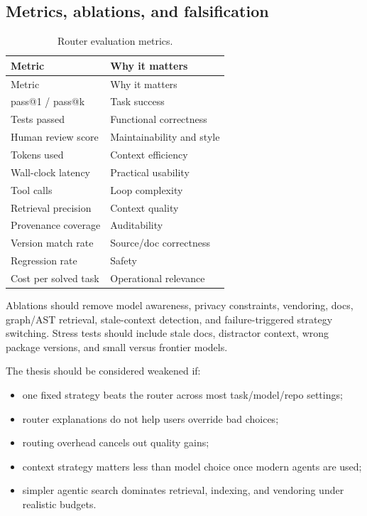 \documentclass[
  11pt,
  letterpaper,
  numbers=noendperiod,
  parskip=half]{scrartcl}
\providecommand{\tightlist}{%
  \setlength{\itemsep}{0pt}\setlength{\parskip}{0pt}}
\begin{document}
\subsection{Metrics, ablations, and
falsification}\label{sec-eval-metrics}

\begin{longtable}[]{@{}ll@{}}
\caption{Router evaluation
metrics.}\label{tbl-eval-metrics}\tabularnewline
\toprule\noalign{}
Metric & Why it matters \\
\midrule\noalign{}
\endfirsthead
\toprule\noalign{}
Metric & Why it matters \\
\midrule\noalign{}
\endhead
\bottomrule\noalign{}
\endlastfoot
pass@1 / pass@k & Task success \\
Tests passed & Functional correctness \\
Human review score & Maintainability and style \\
Tokens used & Context efficiency \\
Wall-clock latency & Practical usability \\
Tool calls & Loop complexity \\
Retrieval precision & Context quality \\
Provenance coverage & Auditability \\
Version match rate & Source/doc correctness \\
Regression rate & Safety \\
Cost per solved task & Operational relevance \\
\end{longtable}

Ablations should remove model awareness, privacy constraints, vendoring,
docs, graph/AST retrieval, stale-context detection, and
failure-triggered strategy switching. Stress tests should include stale
docs, distractor context, wrong package versions, and small versus
frontier models.

The thesis should be considered weakened if:

\begin{itemize}
\tightlist
\item
  one fixed strategy beats the router across most task/model/repo
  settings;
\item
  router explanations do not help users override bad choices;
\item
  routing overhead cancels out quality gains;
\item
  context strategy matters less than model choice once modern agents are
  used;
\item
  simpler agentic search dominates retrieval, indexing, and vendoring
  under realistic budgets.
\end{itemize}
\end{document}
